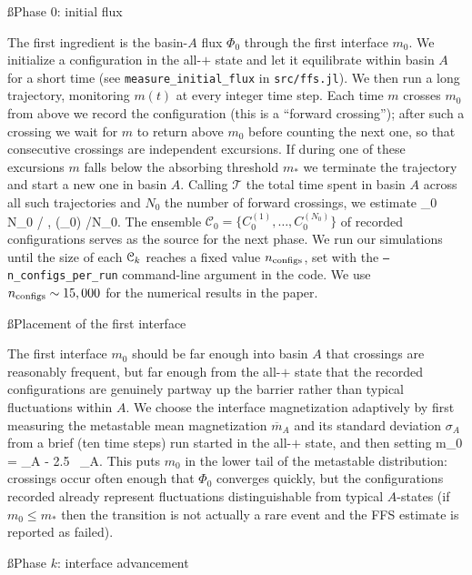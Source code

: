 \documentclass[12pt]{article}
\begin{document}
\ss{Phase 0: initial flux}

The first ingredient is the basin-$A$ flux $\Phi_0$ through the first interface $m_0$. We initialize a configuration in the all-$+$ state and let it equilibrate within basin $A$ for a short time (see \texttt{measure\_initial\_flux} in \texttt{src/ffs.jl}). We then run a long trajectory, monitoring $m(t)$ at every integer time step. Each time $m$ crosses $m_0$ from above we record the configuration (this is a ``forward crossing''); after such a crossing we wait for $m$ to return above $m_0$ before counting the next one, so that consecutive crossings are independent excursions. If during one of these excursions $m$ falls below the absorbing threshold $m_*$ we terminate the trajectory and start a new one in basin $A$. Calling $\mathcal{T}$ the total time spent in basin $A$ across all such trajectories and $N_0$ the number of forward crossings, we estimate
\be \label{eq:phi0} \Phi_0 \approx N_0 / , \qquad {}(\ln \Phi_0) /N_0.\ee
The ensemble $\mathcal{C}_0 = \{C_0^{(1)}, \dots, C_0^{(N_0)}\}$ of recorded configurations serves as the source for the next phase. We run our simulations until the size of each $\mathcal{C}_k$ reaches a fixed value $n_{\rm configs}$, set with the \texttt{--n\_configs\_per\_run} command-line argument in the code. We use $n_{\rm configs} \sim 15,000$ for the numerical results in the paper. 

\ss{Placement of the first interface}

The first interface $m_0$ should be far enough into basin $A$ that crossings are reasonably frequent, but far enough from the all-$+$ state that the recorded configurations are genuinely partway up the barrier rather than typical fluctuations within $A$. We choose the interface magnetization adaptively by first measuring the metastable mean magnetization $\overline{m}_A$ and its standard deviation $\sigma_A$ from a brief (ten time steps) run started in the all-$+$ state, and then setting
\be m_0 = _A - 2.5 \, \sigma_A.\ee
This puts $m_0$ in the lower tail of the metastable distribution: crossings occur often enough that $\Phi_0$ converges quickly, but the configurations recorded already represent fluctuations distinguishable from typical $A$-states (if $m_0 \le m_*$ then the transition is not actually a rare event and the FFS estimate is reported as failed).

\ss{Phase $k$: interface advancement}
\end{document}
